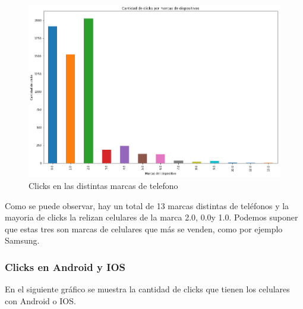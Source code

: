 \documentclass[a4paper, 12pt]{article}
\newcommand\tab[1][1cm]{\hspace*{#1}}
\begin{document}
		\FloatBarrier
		\begin{figure}[h]
			\centering
			\includegraphics[width=\textwidth]{images/clicks/clicks_brand.png}
			\caption{Clicks en las distintas marcas de telefono}
		\end{figure}
		\FloatBarrier

		\tab Como se puede observar, hay un total de 13 marcas distintas de teléfonos y la mayoria de clicks la relizan celulares de la marca 2.0, 0.0y 1.0. Podemos suponer que estas tres son marcas de celulares que más se venden, como por ejemplo Samsung.

	\subsubsection{Clicks en Android y IOS}
		\tab En el siguiente gráfico se muestra la cantidad de clicks que tienen los celulares con Android o IOS.
\end{document}
